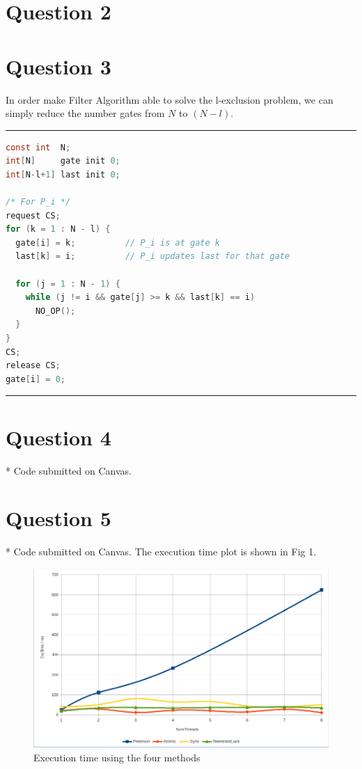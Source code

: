 \documentclass[12pt]{article}
\begin{document}
\section*{Question 2}

\section*{Question 3} 
In order make Filter Algorithm able to solve the l-exclusion problem, we can simply reduce the number gates from $N$ to $(N - l)$. \\
\noindent\rule[0.5ex]{\linewidth}{1pt}
\begin{lstlisting}[language=C] 
const int  N;           
int[N]     gate init 0; 
int[N-l+1] last init 0; 

/* For P_i */ 
request CS; 
for (k = 1 : N - l) { 
  gate[i] = k;          // P_i is at gate k 
  last[k] = i;          // P_i updates last for that gate 
	
  for (j = 1 : N - 1) {
	while (j != i && gate[j] >= k && last[k] == i) 
	  NO_OP(); 
  }
}
CS; 
release CS; 
gate[i] = 0; 
\end{lstlisting}
\noindent\rule[0.5ex]{\linewidth}{1pt}

\section*{Question 4} 
* Code submitted on Canvas. 

\section*{Question 5}  
* Code submitted on Canvas. The execution time plot is shown in Fig 1. 
\begin{figure} 
	 \includegraphics[width=\linewidth]{plot.png}
	 \caption{Execution time using the four methods}
\end{figure} 
\end{document}
